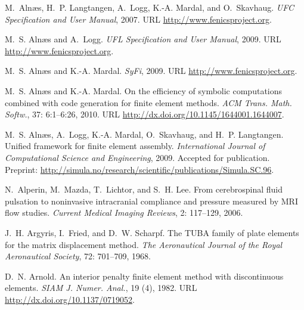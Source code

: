 \begin{thebibliography}{467}
M.~Aln\ae{}s, H.~P. Langtangen, A.~Logg, K.-A. Mardal, and O.~Skavhaug.
\newblock \emph{{UFC} Specification and User Manual}, 2007.
\newblock URL \url{http://www.fenicsproject.org}.

M.~S. Aln\ae{}s and A.~Logg.
\newblock \emph{{UFL} Specification and User Manual}, 2009.
\newblock URL \url{http://www.fenicsproject.org}.

M.~S. Aln{\ae}s and K.-A. Mardal.
\newblock \emph{{SyFi}}, 2009.
\newblock URL \url{http://www.fenicsproject.org}.

M.~S. Aln{\ae}s and K.-A. Mardal.
\newblock On the efficiency of symbolic computations combined with code
  generation for finite element methods.
\newblock \emph{ACM Trans. Math. Softw.}, 37: 6:1--6:26, 2010.
\newblock URL \url{http://dx.doi.org/10.1145/1644001.1644007}.

M.~S. Aln\ae{}s, A.~Logg, K.-A. Mardal, O.~Skavhaug, and H.~P. Langtangen.
\newblock Unified framework for finite element assembly.
\newblock \emph{International Journal of Computational Science and
  Engineering}, 2009.
\newblock Accepted for publication. Preprint:
  \url{http://simula.no/research/scientific/publications/Simula.SC.96}.

N.~Alperin, M.~Mazda, T.~Lichtor, and S.~H. Lee.
\newblock From cerebrospinal fluid pulsation to noninvasive intracranial
  compliance and pressure measured by {MRI} flow studies.
\newblock \emph{Current Medical Imaging Reviews}, 2: 117--129, 2006.

J.~H. Argyris, I.~Fried, and D.~W. Scharpf.
\newblock The {TUBA} family of plate elements for the matrix displacement
  method.
\newblock \emph{The Aeronautical Journal of the Royal Aeronautical Society},
  72: 701--709, 1968.

D.~N. Arnold.
\newblock An interior penalty finite element method with discontinuous
  elements.
\newblock \emph{SIAM J. Numer. Anal.}, 19 (4), 1982.
\newblock URL \url{http://dx.doi.org/10.1137/0719052}.


\end{thebibliography}
